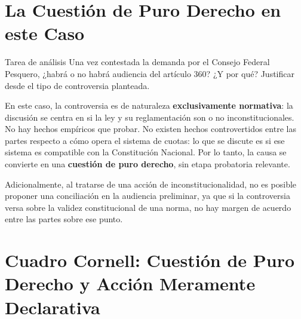 \documentclass[12pt,oneside]{book}
\begin{document}
\section{La Cuestión de Puro Derecho en este Caso}

\begin{exercise}{Tarea de análisis}
Una vez contestada la demanda por el Consejo Federal Pesquero, ¿habrá o no habrá audiencia del artículo 360? ¿Y por qué? Justificar desde el tipo de controversia planteada.
\end{exercise}

En este caso, la controversia es de naturaleza \textbf{exclusivamente normativa}: la discusión se centra en si la ley y su reglamentación son o no inconstitucionales. No hay hechos empíricos que probar. No existen hechos controvertidos entre las partes respecto a cómo opera el sistema de cuotas: lo que se discute es si ese sistema es compatible con la Constitución Nacional. Por lo tanto, la causa se convierte en una \textbf{cuestión de puro derecho}, sin etapa probatoria relevante.

Adicionalmente, al tratarse de una acción de inconstitucionalidad, no es posible proponer una conciliación en la audiencia preliminar, ya que si la controversia versa sobre la validez constitucional de una norma, no hay margen de acuerdo entre las partes sobre ese punto.

\section*{Cuadro Cornell: Cuestión de Puro Derecho y Acción Meramente Declarativa}
\end{document}
